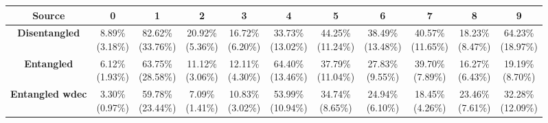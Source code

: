 \documentclass{report}
\begin{document}
\begin{center}
{\tiny
  \begin{tabular}{|c|c|c|c|c|c|c|c|c|c|c|}
  \hline
  \textbf{Source} & \textbf{0} & \textbf{1} & \textbf{2} & \textbf{3} & \textbf{4} & \textbf{5} & \textbf{6} & \textbf{7} & \textbf{8} & \textbf{9}  \\ \hline
  \textbf{Disentangled} & \cellcolor{light-gray} \makecell{8.89\% \\ (3.18\%)} & \cellcolor{light-gray} \makecell{82.62\% \\ (33.76\%)} & \cellcolor{light-gray} \makecell{20.92\% \\ (5.36\%)} & \cellcolor{light-gray} \makecell{16.72\% \\ (6.20\%)} & \makecell{33.73\% \\ (13.02\%)} & \cellcolor{light-gray} \makecell{44.25\% \\ (11.24\%)} & \cellcolor{light-gray} \makecell{38.49\% \\ (13.48\%)} & \cellcolor{light-gray} \makecell{40.57\% \\ (11.65\%)} & \makecell{18.23\% \\ (8.47\%)} & \cellcolor{light-gray} \makecell{64.23\% \\ (18.97\%)} \\ \hline
  \textbf{Entangled} & \makecell{6.12\% \\ (1.93\%)} & \makecell{63.75\% \\ (28.58\%)} & \makecell{11.12\% \\ (3.06\%)} & \makecell{12.11\% \\ (4.30\%)} & \cellcolor{light-gray} \makecell{64.40\% \\ (13.46\%)} & \makecell{37.79\% \\ (11.04\%)} & \makecell{27.83\% \\ (9.55\%)} & \makecell{39.70\% \\ (7.89\%)} & \makecell{16.27\% \\ (6.43\%)} & \makecell{19.19\% \\ (8.70\%)} \\ \hline
  \textbf{Entangled wdec} & \makecell{3.30\% \\ (0.97\%)} & \makecell{59.78\% \\ (23.44\%)} & \makecell{7.09\% \\ (1.41\%)} & \makecell{10.83\% \\ (3.02\%)} & \makecell{53.99\% \\ (10.94\%)} & \makecell{34.74\% \\ (8.65\%)} & \makecell{24.94\% \\ (6.10\%)} & \makecell{18.45\% \\ (4.26\%)} & \cellcolor{light-gray} \makecell{23.46\% \\ (7.61\%)} & \makecell{32.28\% \\ (12.09\%)} \\ \hline
  \end{tabular}
}
\end{center}
\end{document}
